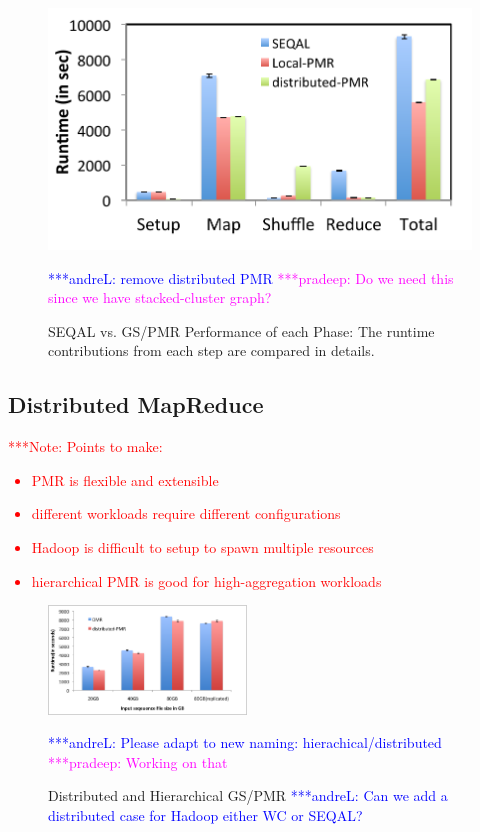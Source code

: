 \documentclass{acm_proc_article-sp}
\newcommand{\alnote}[1]{ {\textcolor{blue} { ***andreL: #1 }}}
\newcommand{\pnote}[1]{ {\textcolor{magenta} { ***pradeep: #1 }}}
\newcommand{\note}[1]{ {\textcolor{red} { ***Note: #1 }}}
\newcommand{\alnote}[1]{}
\newcommand{\pnote}[1]{}
\newcommand{\note}[1]{}
\newcommand{\pilotmapreduce}{Pilot-MapReduce\xspace}
\begin{document}
\begin{figure} 
 \centering
\includegraphics[scale=0.50]{figures/8GB_phasewisetimes.pdf}
\caption{SEQAL vs. GS/PMR Performance of each Phase:  The runtime  contributions from each step are compared in details.}
\alnote{remove distributed PMR }
\pnote{ Do we need this since we have stacked-cluster graph?}
 \label{fig:comp_with_seqal_2} 
\end{figure}


\subsection{Distributed MapReduce}
\note{Points to make:
\begin{itemize}
	\item PMR is flexible and extensible
	\item different workloads require different configurations
	\item Hadoop is difficult to setup to spawn multiple resources
	\item hierarchical PMR is good for high-aggregation workloads
\end{itemize}}



\begin{figure}[t]
	\centering
		\includegraphics[width=0.47\textwidth]{figures/dmrvspmr.png}
	\caption{Distributed and Hierarchical GS/PMR
	\alnote{Can we add a distributed case for Hadoop either WC or SEQAL?}} 
	\alnote{Please adapt to new naming: hierachical/distributed}
        \pnote{ Working on that}
	\label{fig:figures_dmrvspmr}
\end{figure}
\end{document}
